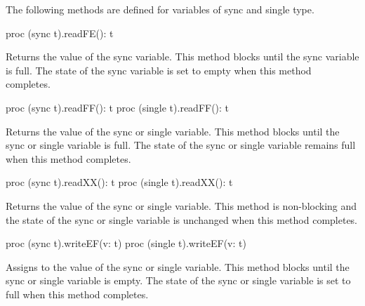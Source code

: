 The following methods are defined for variables of sync and single
type.

\begin{protohead}
proc (sync t).readFE(): t
\end{protohead}
\begin{protobody}
Returns the value of the sync variable.  This method blocks until the
sync variable is full.  The state of the sync variable is set to empty
when this method completes.
\end{protobody}

\begin{protohead}
proc (sync t).readFF(): t
proc (single t).readFF(): t
\end{protohead}
\begin{protobody}
Returns the value of the sync or single variable.  This method blocks
until the sync or single variable is full.  The state of the sync or
single variable remains full when this method completes.
\end{protobody}

\begin{protohead}
proc (sync t).readXX(): t
proc (single t).readXX(): t
\end{protohead}
\begin{protobody}
Returns the value of the sync or single variable.  This method is non-blocking
and the state of the sync or single variable is unchanged when this method
completes.
\end{protobody}

\begin{protohead}
proc (sync t).writeEF(v: t)
proc (single t).writeEF(v: t)
\end{protohead}
\begin{protobody}
Assigns  to the value of the sync or single variable.  This
method blocks until the sync or single variable is empty.  The state
of the sync or single variable is set to full when this method
completes.
\end{protobody}


